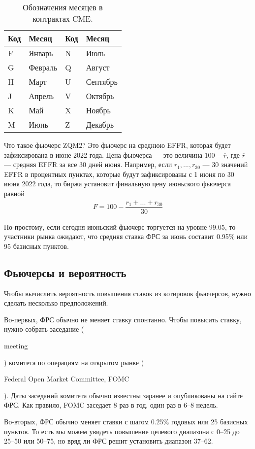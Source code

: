 \documentclass[a4paper,14pt]{extarticle}
\newcommand{\en}[1]{\begin{otherlanguage}{english}#1\end{otherlanguage}}
\begin{document}
\begin{table}[h]
\centering
\begin{tabular}{l|l|l|l}
Код & Месяц   & Код & Месяц \\ \hline
F   & Январь  & N   & Июль \\
G   & Февраль & Q   & Август \\
H   & Март    & U   & Сентябрь \\
J   & Апрель  & V   & Октябрь \\
K   & Май     & X   & Ноябрь \\
M   & Июнь    & Z   & Декабрь \\
\end{tabular}
\caption{Обозначения месяцев в контрактах CME.}
\label{month_table}
\end{table}

Что такое фьючерс ZQM2? Это фьючерс на среднюю EFFR, которая будет зафиксирована в июне 
2022 года. Цена фьючерса --- это величина $100 - \overline{r}$, где $\overline{r}$ --- 
средняя EFFR за все 30 дней июня. Например, если $r_1,...,r_{30}$ --- 30 значений EFFR в 
процентных пунктах, которые будут зафиксированы с 1 июня по 30 июня 2022 года, то биржа 
установит финальную цену июньского фьючерса равной
\begin{align*}
F = 100 - \dfrac{r_1+...+r_{30}}{30}
\end{align*}

По-простому, если сегодня июньский фьючерс торгуется на уровне 
99.05, то участники рынка ожидают, что средняя ставка ФРС за июнь составит 0.95\% или 95 
базисных пунктов.

\subsection*{Фьючерсы и вероятность}

Чтобы вычислить вероятность повышения ставок из котировок фьючерсов, нужно сделать 
несколько предположений.

Во-первых, ФРС обычно не меняет ставку спонтанно. Чтобы повысить ставку, нужно собрать 
заседание (\en{meeting}) комитета по операциям на открытом рынке (\en{Federal Open Market 
Committee, FOMC}). Даты заседаний комитета обычно известны заранее и опубликованы на 
сайте ФРС. Как правило, FOMC заседает 8 раз в год, один раз в 6--8 недель.

Во-вторых, ФРС обычно меняет ставки с шагом 0.25\% годовых или 25 базисных пунктов. То 
есть мы можем увидеть повышение целевого диапазона с 0--25 до 25--50 или 50--75, но вряд
ли ФРС решит установить диапазон 37--62.
\end{document}
